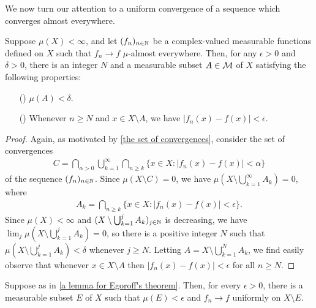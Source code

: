 We now turn our attention to a uniform convergence of a sequence which converges almost everywhere.
\begin{lem}\label{a lemma for Egoroff's theorem}
    Suppose $\mu(X)<\infty$, and let $(f_n)_{n\in{\mathbb{N}}}$ be a complex-valued measurable functions defined on $X$ such that $f_n\rightarrow f$ $\mu$-almost everywhere.
    Then, for any $\epsilon>0$ and $\delta>0$, there is an integer $N$ and a measurable subset $A\in{\mathcal{M}}$ of $X$ satisfying the following properties:
    \begin{enumerate}
        \item[(\romannumeral 1)]
        {
            $\mu(A)<\delta$.
        }
        \item[(\romannumeral 2)]
        {
            Whenever $n\geq N$ and $x\in X\setminus A$, we have $|f_n(x)-f(x)|<\epsilon$.
        }
    \end{enumerate}
\end{lem}
\begin{proof}
    Again, as motivated by \cref{the set of convergences}, consider the set of convergences
    \begin{align*}
        C=\bigcap_{\alpha>0} \bigcup_{k=1}^\infty \bigcap_{n\geq k} \{x\in X: |f_n(x)-f(x)|<\alpha\}
    \end{align*}
    of the sequence $(f_n)_{n\in{\mathbb{N}}}$.
    Since $\mu(X\setminus C)=0$, we have $\mu\left(X\setminus \bigcup_{k=1}^\infty A_k\right)=0$, where
    \begin{align*}
        A_k=\bigcap_{n\geq k} \{x\in X: |f_n(x)-f(x)|<\epsilon\}.
    \end{align*}
    Since $\mu(X)<\infty$ and $(X\setminus\bigcup_{k=1}^j A_k)_{j\in{\mathbb{N}}}$ is decreasing, we have $\lim_j \mu(X\setminus\bigcup_{k=1}^j A_k)=0$, so there is a positive integer $N$ such that $\mu(X\setminus \bigcup_{k=1}^j A_k)<\delta$ whenever $j\geq N$.
    Letting $A=X\setminus \bigcup_{k=1}^N A_k$, we find easily observe that whenever $x\in X\setminus A$ then $|f_n(x)-f(x)|<\epsilon$ for all $n\geq N$.
\end{proof}
\begin{thm}
    Suppose as in \cref{a lemma for Egoroff's theorem}.
    Then, for every $\epsilon>0$, there is a measurable subset $E$ of $X$ such that $\mu(E)<\epsilon$ and $f_n\rightarrow f$ uniformly on $X\setminus E$.
\end{thm}
